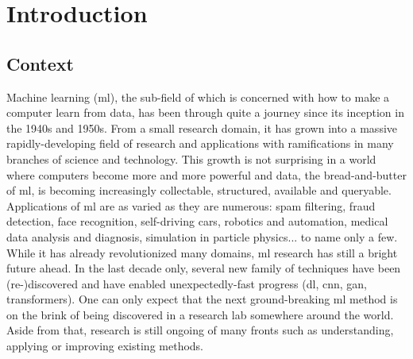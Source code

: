 \chapter{Introduction}

\section{Context}

Machine learning (\acrshort{ml}), the sub-field of  which is concerned with how to make a computer learn from data, has been through quite a journey since its inception in the 1940s and 1950s. From a small research domain, it has grown into a massive rapidly-developing field of research and applications with ramifications in many branches of science and technology. This growth is not surprising in a world where computers become more and more powerful and data, the bread-and-butter of \acrlong{ml}, is becoming increasingly collectable, structured, available and queryable. Applications of \acrlong{ml} are as varied as they are numerous: spam filtering, fraud detection, face recognition, self-driving cars, robotics and automation, medical data analysis and diagnosis, simulation in particle physics... to name only a few. While it has already revolutionized many domains, \acrlong{ml} research has still a bright future ahead. In the last decade only, several new family of techniques have been (re-)discovered and have enabled unexpectedly-fast progress (\eg \acrlong{dl}, \acrlong{cnn}, \acrlong{gan}, transformers). One can only expect that the next ground-breaking \acrshort{ml} method is on the brink of being discovered in a research lab somewhere around the world. Aside from that, research is still ongoing of many fronts such as understanding, applying or improving existing methods.

